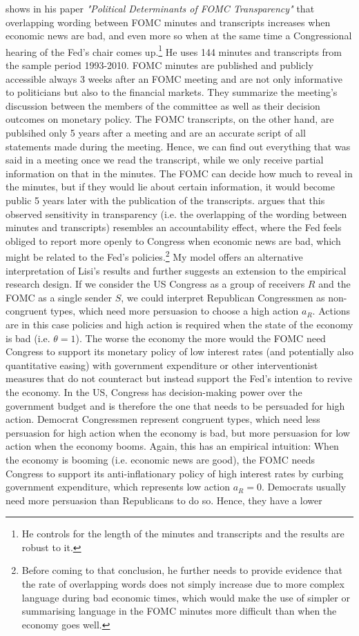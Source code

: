 \documentclass[paper=a4,12pt,DIV=11,twoside=false]{scrartcl}
\begin{document}
\noindent \citet{GL2017} shows in his paper \textit{"Political Determinants of FOMC Transparency"} that overlapping wording between FOMC minutes and transcripts increases when economic news are bad, and even more so when at the same time a Congressional hearing of the Fed's chair comes up.\footnote{He controls for the length of the minutes and transcripts and the results are robust to it.} He uses 144 minutes and transcripts from the sample period 1993-2010. FOMC minutes are published and publicly accessible always 3 weeks after an FOMC meeting and are not only informative to politicians but also to the financial markets. They summarize the meeting's discussion between the members of the committee as well as their decision outcomes on monetary policy. The FOMC transcripts, on the other hand, are publsihed only 5 years after a meeting and are an accurate script of all statements made during the meeting. Hence, we can find out everything that was said in a meeting once we read the transcript, while we only receive partial information on that in the minutes. The FOMC can decide how much to reveal in the minutes, but if they would lie about certain information, it would become public 5 years later with the publication of the transcripts. \citet{GL2017} argues that this observed sensitivity in transparency (i.e. the overlapping of the wording between minutes and transcripts) resembles an accountability effect, where the Fed feels obliged to report more openly to Congress when economic news are bad, which might be related to the Fed's policies.\footnote{Before coming to that conclusion, he further needs to provide evidence that the rate of overlapping words does not simply increase due to more complex language during bad economic times, which would make the use of simpler or summarising language in the FOMC minutes more difficult than when the economy goes well.} My model offers an alternative interpretation of Lisi's results and further suggests an extension to the empirical research design. If we consider the US Congress as a group of receivers $R$ and the FOMC as a single sender $S$, we could interpret Republican Congressmen as non-congruent types, which need more persuasion to choose a high action $a_R$. Actions are in this case policies and high action is required when the state of the economy is bad (i.e. $\theta = 1$). The worse the economy the more would the FOMC need Congress to support its monetary policy of low interest rates (and potentially also quantitative easing) with government expenditure or other interventionist measures that do not counteract but instead support the Fed's intention to revive the economy. In the US, Congress has decision-making power over the government budget and is therefore the one that needs to be persuaded for high action. Democrat Congressmen represent congruent types, which need less persuasion for high action when the economy is bad, but more persuasion for low action when the economy booms. Again, this has an empirical intuition: When the economy is booming (i.e. economic news are good), the FOMC needs Congress to support its anti-inflationary policy of high interest rates by curbing government expenditure, which represents low action $a_{R}=0$. Democrats usually need more persuasion than Republicans to do so. Hence, they have a lower 
\end{document}
